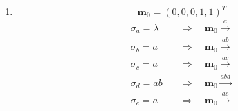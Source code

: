 \documentclass[a4paper]{scrartcl}
\begin{document}
\begin{enumerate}
    \item
        \begin{equation}
            \textbf{m}_0 = \left( 0, 0, 0, 1, 1 \right)^T
        \end{equation}
        \begin{equation}
            \begin{split}
                \sigma_a = \lambda \quad &\Rightarrow \quad 
                \textbf{m}_0 \stackrel{a}{\longrightarrow} \\
                \sigma_b = a \quad &\Rightarrow \quad 
                \textbf{m}_0 \stackrel{ab}{\longrightarrow} \\
                \sigma_c = a \quad &\Rightarrow \quad 
                \textbf{m}_0 \stackrel{ac}{\longrightarrow} \\
                \sigma_d = ab \quad &\Rightarrow \quad 
                \textbf{m}_0 \stackrel{abd}{\longrightarrow} \\
                \sigma_e = a \quad &\Rightarrow \quad 
                \textbf{m}_0 \stackrel{ae}{\longrightarrow}
            \end{split}
        \end{equation}
        
\end{enumerate}
\end{document}
